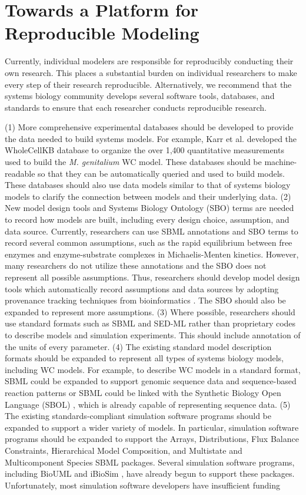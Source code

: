 \documentclass[journal,transmag,twoside]{IEEEtran}
\begin{document}
\section{Towards a Platform for Reproducible Modeling}

Currently, individual modelers are responsible for reproducibly conducting their own research. This places a substantial burden on individual researchers to make every step of their research reproducible. Alternatively, we recommend that the systems biology community develops several software tools, databases, and standards to ensure that each researcher conducts reproducible research.

(1) More comprehensive experimental databases should be developed to provide the data needed to build systems models.  For example, Karr et al. developed the WholeCellKB database \cite{karr2013wholecellkb} to organize the over 1,400 quantitative measurements used to build the \textit{M. genitalium} WC model. These databases should be machine-readable so that they can be automatically queried and used to build models. These databases should also use data models similar to that of systems biology models to clarify the connection between models and their underlying data. (2) New model design tools and Systems Biology Ontology (SBO) \cite{juty2013systems} terms are needed to record how models are built, including every design choice, assumption, and data source. Currently, researchers can use SBML annotations and SBO terms to record several common assumptions, such as the rapid equilibrium between free enzymes and enzyme-substrate complexes in Michaelis-Menten kinetics. However, many researchers do not utilize these annotations and the SBO does not represent all possible assumptions. Thus, researchers should develop model design tools which automatically record assumptions and data sources by adopting provenance tracking techniques from bioinformatics \cite{callahan2006vistrails, hillman2012using, oinn2004taverna}. The SBO should also be expanded to represent more assumptions. (3) Where possible, researchers should use standard formats such as SBML and SED-ML rather than proprietary codes to describe models and simulation experiments. This should include annotation of the units of every parameter. (4) The existing standard model description formats should be expanded to represent all types of systems biology models, including WC models. For example, to describe WC models in a standard format, SBML could be expanded to support genomic sequence data and sequence-based reaction patterns or SBML could be linked with the Synthetic Biology Open Language (SBOL) \cite{galdzicki2014synthetic}, which is already capable of representing sequence data. (5) The existing standards-compliant simulation software programs should be expanded to support a wider variety of models. In particular, simulation software programs should be expanded to support the Arrays, Distributions, Flux Balance Constraints, Hierarchical Model Composition, and Multistate and Multicomponent Species SBML packages. Several simulation software programs, including BioUML \cite{Kolpakov2006} and iBioSim \cite{Stevens2013}, have already begun to support these packages. Unfortunately, most simulation software developers have insufficient funding 
\end{document}
